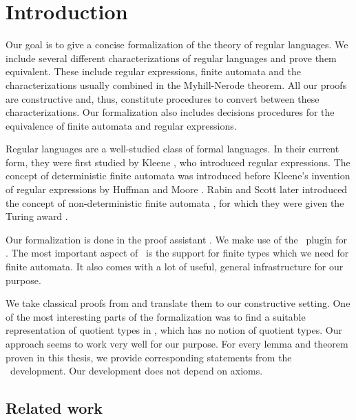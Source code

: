 \chapter{Introduction}
\label{chap:intro}

Our goal is to give a concise formalization of the theory of regular languages. 
We include several different characterizations of regular languages and prove them equivalent.
These include regular expressions, finite automata and the characterizations usually combined in the Myhill-Nerode theorem.
All our proofs are constructive and, thus, constitute procedures to convert between these characterizations.
Our formalization also includes decisions procedures for the equivalence of finite automata and regular expressions.

Regular languages are a well-studied class of formal languages. 
In their current form, they were first studied by Kleene \cite{KleeneNets}, who introduced regular expressions. 
The concept of deterministic finite automata was introduced before Kleene's invention of regular expressions by Huffman \cite{Huffman1954161} and Moore \cite{Moore56}. 
Rabin and Scott later introduced the concept of non-deterministic finite automata \cite{Rabin:1959:FAD:1661907.1661909}, for which they were given the Turing award \cite{Ashenhurst:1987:ATA:27609}.

Our formalization is done in the proof assistant \coq. 
We make use of the \ssreflect\ plugin for \coq. 
The most important aspect of \ssreflect\ is the support for finite types which we need for finite automata. 
It also comes with a lot of useful, general infrastructure for our purpose.

We take classical proofs from \cite{DBLP:books/daglib/0088160} and translate them to our constructive setting. 
One of the most interesting parts of the formalization was to find a suitable representation of quotient types in \coq, which has no notion of quotient types.
Our approach seems to work very well for our purpose.
For every lemma and theorem proven in this thesis, we provide corresponding statements from the \coq\ development. 
Our development does not depend on axioms.



\section{Related work}


